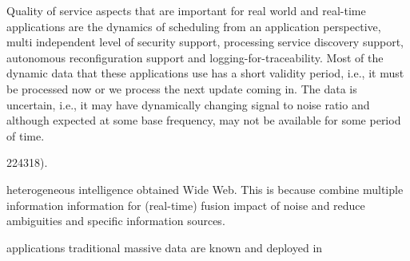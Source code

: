 \documentclass[times]{cpeauth}
\begin{document}
Quality of service aspects that are important for real world and real-time
applications are the dynamics of scheduling from an application perspective,
multi independent level of security support, processing service discovery
support, autonomous reconfiguration support and logging-for-traceability.  Most
of the dynamic data that these applications use has a short validity period,
i.e., it must be processed now or we process the next update coming in. The data
is uncertain, i.e., it may have dynamically changing signal to noise ratio and
although expected at some base frequency, may not be available for some period
of time.






224318).


heterogeneous %
intelligence obtained %
Wide Web. This is because %
combine multiple information %
information for (real-time) fusion %
impact of noise and reduce ambiguities and %
specific information sources.

applications %
traditional massive data %
are known and deployed in %

\end{document}
